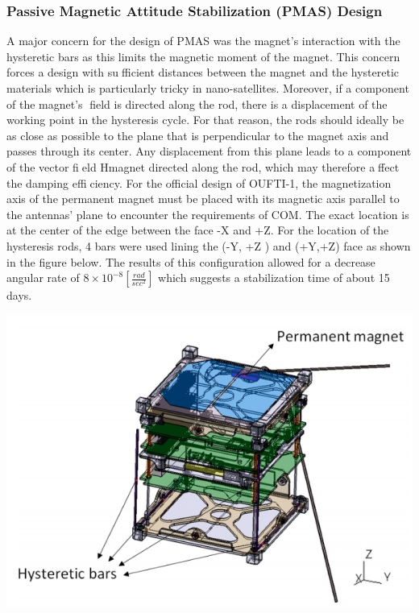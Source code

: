 \documentclass[12pt]{article}
\begin{document}
\subsubsection{Passive Magnetic Attitude Stabilization (PMAS) Design}
A major concern for the design of PMAS was the magnet's interaction with the hysteretic bars as this limits the magnetic moment of the magnet. This concern forces a design with sufficient distances between the magnet and the hysteretic materials which is particularly tricky in nano-satellites. Moreover, if a component of the magnet's field is directed along the rod, there is a displacement of the working point in the hysteresis cycle. For that reason, the rods should ideally be as close as possible to the plane that is perpendicular to the magnet axis and passes through its center. Any displacement from this plane leads to a component of the vector field Hmagnet directed along the rod, which may therefore affect the damping efficiency. 
\newline \newline
For the official design of OUFTI-1, the magnetization axis of the permanent magnet must be placed with its magnetic axis parallel to the antennas' plane to encounter the requirements of COM. The exact location is at the center of the edge between the face -X and +Z. For the location of the hysteresis rods, 4 bars were used lining the (-Y, +Z ) and (+Y,+Z) face as shown in the figure below. The results of this configuration allowed for a decrease angular rate of $8\times10^{-8} [\frac{rad}{sec^2}]$ which suggests a stabilization time of about 15 days.
\begin{center}
\includegraphics[scale=0.8]{1.png}
\end{center}
\end{document}
